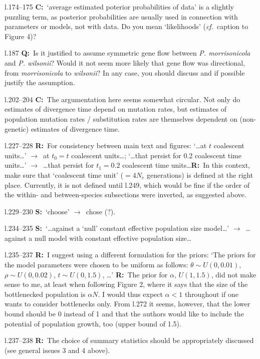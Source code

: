 \documentclass[11pt]{article}
\newenvironment{my_description}
{\begin{description}
  \setlength{\itemsep}{2pt}
  \setlength{\parskip}{0pt}
  \setlength{\parsep}{0pt}}
{\end{description}}
\newcommand{\ra}{$\rightarrow$\ }
\newcommand{\C}{\textbf{C:}\ }
\newcommand{\Q}{\textbf{Q:}\ }
\newcommand{\R}{\textbf{R:}\ }
\newcommand{\V}{\textbf{S:}\ }
\begin{document}
\begin{my_description}
	\item[l.174--175] \C `average estimated poterior probabilities of data' is a slightly puzzling term, as posterior probabilities are usually used in connection with parameters or models, not with data. Do you mean `likelihoods' (\emph{cf.}\ caption to Figure 4)?
	\item[l.187] \Q Is it justified to assume symmetric gene flow between \emph{P. morrisonicola} and \emph{P. wilsonii}? Would it not seem more likely that gene flow was directional, from \emph{morrisonicola} to \emph{wilsonii}? In any case, you should discuss and if possible justify the assumption.
	\item[l.202--204] \C The argumentation here seems somewhat circular. Not only do estimates of divergence time depend on mutation rates, but estimates of population mutation rates / substitution rates are themselves dependent on (non-genetic) estimates of divergence time.
	\item[l.227--228] \R For consistency between main text and figures: `\dots at $t$ coalescent units\dots' \ra at $t_0 = t$ coalescent units\dots; `\dots that persist for 0.2 coalescent time units\dots' \ra \dots that persist for $t_1 = 0.2$ coalescent time units\dots \R In this context, make sure that `coalescent time unit' ($=4N_e$ generations) is defined at the right place. Currently, it is not defined until l.249, which would be fine if the order of the within- and between-species subsections were inverted, as suggested above.
	\item[l.229--230] \V `choose' \ra chose (?).
	\item[l.234--235] \V `\dots against a `null' constant effective population size model\dots' \ra \dots against a null model with constant effective population size\dots
	\item[l.235--237] \R I suggest using a different formulation for the priors: `The priors for the model parameters were chosen to be uniform as follows: $\theta \sim U(0, 0.01)$, $\rho \sim U(0, 0.02)$, $t \sim U(0, 1.5)$, \dots' \R The prior for $\alpha$,  $U(1,1.5)$, did not make sense to me, at least when following Figure 2, where it says that the size of the bottlenecked population is $\alpha N$. I would thus expect $\alpha < 1$ throughout if one wants to consider bottlenecks only. From l.272 it seems, however, that the lower bound should be 0 instead of 1 and that the authors would like to include the potential of population growth, too (upper bound of 1.5).
	\item[l.237--238] \R The choice of summary statistics should be appropriately discussed (see general issues 3 and 4 above).

\end{my_description}
\end{document}
